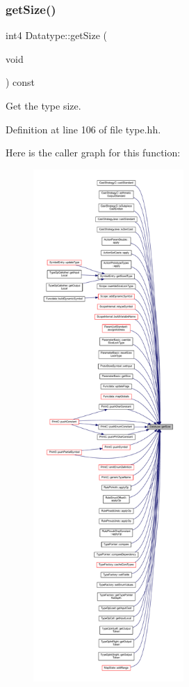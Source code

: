 \subsubsection{\texorpdfstring{getSize()}{getSize()}}
{\footnotesize\ttfamily int4 Datatype\+::get\+Size (\begin{DoxyParamCaption}\item[{void}]{ }\end{DoxyParamCaption}) const\hspace{0.3cm}{\ttfamily [inline]}}



Get the type size. 



Definition at line 106 of file type.\+hh.

Here is the caller graph for this function\+:
\nopagebreak
\begin{figure}[H]
\begin{center}
\leavevmode
\includegraphics[height=550pt]{class_datatype_aadd1006bf1bfff07a3230c2062e7fa52_icgraph}
\end{center}
\end{figure}
\mbox{\label{class_datatype_ac310ccfdc47d145f10699fa1e14e73b4}} 
